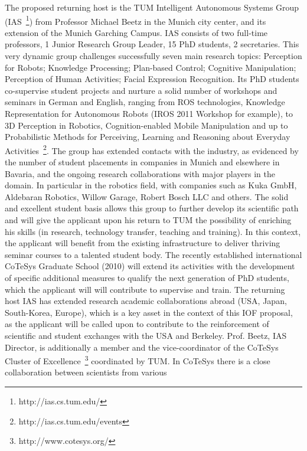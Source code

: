 The proposed returning host  is the TUM Intelligent Autonomous Systems
Group (IAS~\footnote{http://ias.cs.tum.edu/}) from Professor Michael  
Beetz in the Munich city center, and its extension of the Munich Garching 
Campus. IAS consists of two  full-time   professors,  1  Junior  
Research   Group  Leader,  15 PhD  students, 2  secretaries.  This  very dynamic  group challenges
successfully  seven  main  research  topics: Perception  for  Robots;
Knowledge Processing; Plan-based Control; Cognitive Manipulation; 
Perception of  Human Activities; Facial Expression Recognition.
Its PhD  students co-supervise student projects and  nurture a solid
number of workshops  and seminars in German and  English, ranging from
ROS technologies, Knowledge Representation for Autonomous Robots (IROS
2011   Workshop  for   example),   to  3D   Perception  in   Robotics,
Cognition-enabled Mobile Manipulation  and up to Probabilistic Methods
for Perceiving, Learning and Reasoning about Everyday Activities~\footnote{http://ias.cs.tum.edu/events}. 
The group has  extended contacts  with the industry,  as evidenced  by the
number of student  placements in companies in Munich  and elsewhere in
Bavaria, and the ongoing research collaborations with major players in
the domain. In particular  in the robotics field,  with companies
such  as Kuka  GmbH, Aldebaran  Robotics, Willow Garage, Robert Bosch LLC  
and others.   The solid  and excellent  student basis  allows  this group  
to  further develop  its scientific path and  will give the applicant upon 
his return  to TUM the possibility of enriching his skills (in research, 
technology transfer, teaching and training).  In  this  context,   the applicant  
will  benefit  from  the  existing infrastructure  to  deliver thriving  
seminar  courses  to a  talented
student body. The  recently established international CoTeSys Graduate
School  (2010) will  extend  its activities  with  the development  of
specific  additional  measures  to  qualify  the  next  generation  of
PhD students, which  the applicant will will contribute to supervise  and train.  The
returning  host  IAS has  extended  research academic  collaborations
abroad (USA, Japan, South-Korea, Europe),  which is a key asset in the
context of this  IOF proposal, as the applicant will be  called upon to contribute
to the reinforcement of scientific  and student exchanges with the USA
and Berkeley.
Prof.  Beetz,  IAS  Director,   is  additionally  a  member  and  the
vice-coordinator of the CoTeSys  Cluster of Excellence~\footnote{http://www.cotesys.org/} 
coordinated by TUM.  In CoTeSys there is a  close collaboration  between  scientists from  various
